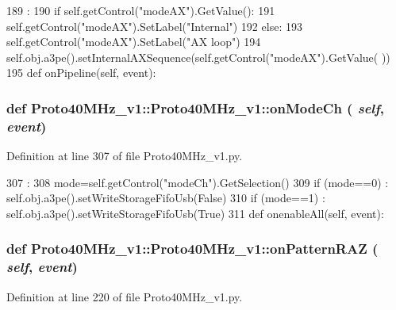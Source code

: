 \begin{DoxyCode}
189                              :
190         if self.getControl("modeAX").GetValue(): 
191             self.getControl("modeAX").SetLabel("Internal")
192         else:
193             self.getControl("modeAX").SetLabel("AX loop")
194         self.obj.a3pe().setInternalAXSequence(self.getControl("modeAX").GetValue(
      ))
195             
    def onPipeline(self, event):
\end{DoxyCode}
\hypertarget{classProto40MHz__v1_1_1Proto40MHz__v1_afe50b62aa3cd9cc1870cfba05baf226d}{
\subsubsection[{onModeCh}]{\setlength{\rightskip}{0pt plus 5cm}def Proto40MHz\_\-v1::Proto40MHz\_\-v1::onModeCh ( {\em self}, \/   {\em event})}}
\label{classProto40MHz__v1_1_1Proto40MHz__v1_afe50b62aa3cd9cc1870cfba05baf226d}


Definition at line 307 of file Proto40MHz\_\-v1.py.


\begin{DoxyCode}
307                             :
308         mode=self.getControl("modeCh").GetSelection()
309         if (mode==0) : self.obj.a3pe().setWriteStorageFifoUsb(False)
310         if (mode==1) : self.obj.a3pe().setWriteStorageFifoUsb(True)
311 
    def onenableAll(self, event):
\end{DoxyCode}
\hypertarget{classProto40MHz__v1_1_1Proto40MHz__v1_ac0d3eac392d23d4611886a28f6679e57}{
\subsubsection[{onPatternRAZ}]{\setlength{\rightskip}{0pt plus 5cm}def Proto40MHz\_\-v1::Proto40MHz\_\-v1::onPatternRAZ ( {\em self}, \/   {\em event})}}
\label{classProto40MHz__v1_1_1Proto40MHz__v1_ac0d3eac392d23d4611886a28f6679e57}


Definition at line 220 of file Proto40MHz\_\-v1.py.


